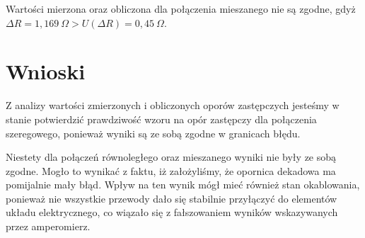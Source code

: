 \documentclass[12pt,a4paper]{article}
\numberwithin{equation}{section}
\begin{document}
Wartości mierzona oraz obliczona dla połączenia mieszanego nie są zgodne, gdyż $\Delta R = 1,169~\Omega > U(\Delta R) = 0,45~\Omega$.

\section{Wnioski}

Z analizy wartości zmierzonych i obliczonych oporów zastępczych jesteśmy w stanie potwierdzić prawdziwość wzoru na opór zastępczy dla połączenia szeregowego, ponieważ wyniki są ze sobą zgodne w granicach błędu.

Niestety dla połączeń równoległego oraz mieszanego wyniki nie były ze sobą zgodne. Mogło to wynikać z faktu, iż założyliśmy, że opornica dekadowa ma pomijalnie mały błąd. Wpływ na ten wynik mógł mieć również stan okablowania, ponieważ nie wszystkie przewody dało się stabilnie przyłączyć do elementów układu elektrycznego, co wiązało się z fałszowaniem wyników wskazywanych przez amperomierz.
\end{document}
